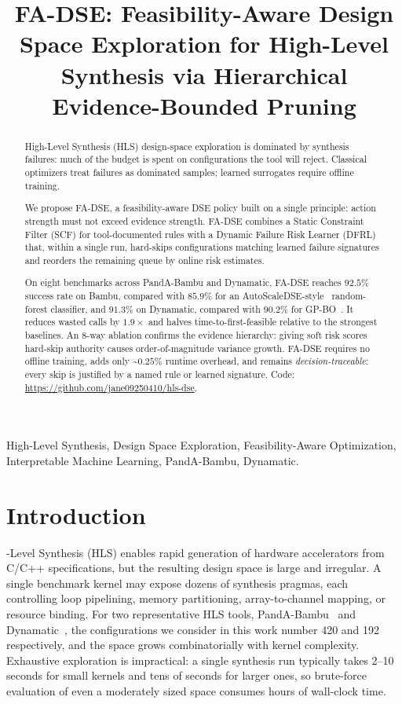 \documentclass[journal]{IEEEtran}
\title{FA-DSE: Feasibility-Aware Design Space Exploration for High-Level Synthesis via Hierarchical Evidence-Bounded Pruning}
\begin{document}
\maketitle
\thispagestyle{plain}

\begin{abstract}
High-Level Synthesis (HLS) design-space exploration is dominated by synthesis failures: much of the budget is spent on configurations the tool will reject. Classical optimizers treat failures as dominated samples; learned surrogates require offline training.

We propose FA-DSE, a feasibility-aware DSE policy built on a single principle: action strength must not exceed evidence strength. FA-DSE combines a Static Constraint Filter (SCF) for tool-documented rules with a Dynamic Failure Risk Learner (DFRL) that, within a single run, hard-skips configurations matching learned failure signatures and reorders the remaining queue by online risk estimates.

On eight benchmarks across PandA-Bambu and Dynamatic, FA-DSE reaches $92.5\%$ success rate on Bambu, compared with $85.9\%$ for an AutoScaleDSE-style~\cite{sohrabizadeh2023autoscaledse} random-forest classifier, and $91.3\%$ on Dynamatic, compared with $90.2\%$ for GP-BO~\cite{ferretti2018lattice}. It reduces wasted calls by $1.9\times$ and halves time-to-first-feasible relative to the strongest baselines. An 8-way ablation confirms the evidence hierarchy: giving soft risk scores hard-skip authority causes order-of-magnitude variance growth. FA-DSE requires no offline training, adds only \textasciitilde{}$0.25\%$ runtime overhead, and remains \emph{decision-traceable}: every skip is justified by a named rule or learned signature. Code: \url{https://github.com/jane09250410/hls-dse}.
\end{abstract}

\begin{IEEEkeywords}
High-Level Synthesis, Design Space Exploration, Feasibility-Aware Optimization, Interpretable Machine Learning, PandA-Bambu, Dynamatic.
\end{IEEEkeywords}



\section{Introduction}
\label{sec:intro}

-Level Synthesis (HLS) enables rapid generation of hardware accelerators from C/C++ specifications, but the resulting design space is large and irregular. A single benchmark kernel may expose dozens of synthesis pragmas, each controlling loop pipelining, memory partitioning, array-to-channel mapping, or resource binding. For two representative HLS tools, PandA-Bambu~\cite{pilato2013bambu} and Dynamatic~\cite{josipovic2018dynamically}, the configurations we consider in this work number 420 and 192 respectively, and the space grows combinatorially with kernel complexity. Exhaustive exploration is impractical: a single synthesis run typically takes 2--10 seconds for small kernels and tens of seconds for larger ones, so brute-force evaluation of even a moderately sized space consumes hours of wall-clock time.
\end{document}
